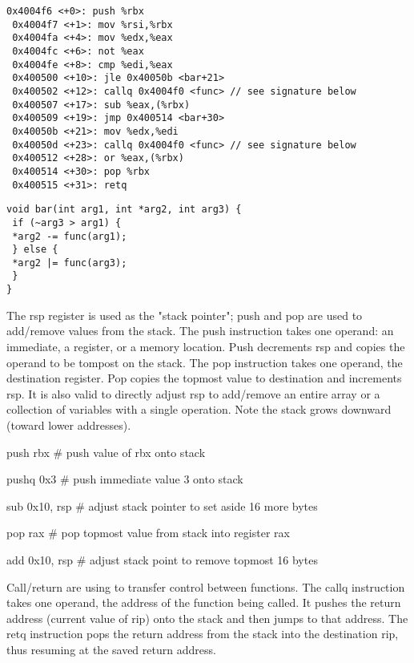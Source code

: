 \documentclass[10pt]{article}
\begin{document}
{\begin{multicols*}{5}
\begin{lstlisting}[breaklines=true,columns=fullflexible]
0x4004f6 <+0>: push %rbx
 0x4004f7 <+1>: mov %rsi,%rbx
 0x4004fa <+4>: mov %edx,%eax
 0x4004fc <+6>: not %eax
 0x4004fe <+8>: cmp %edi,%eax
 0x400500 <+10>: jle 0x40050b <bar+21>
 0x400502 <+12>: callq 0x4004f0 <func> // see signature below
 0x400507 <+17>: sub %eax,(%rbx)
 0x400509 <+19>: jmp 0x400514 <bar+30>
 0x40050b <+21>: mov %edx,%edi
 0x40050d <+23>: callq 0x4004f0 <func> // see signature below
 0x400512 <+28>: or %eax,(%rbx)
 0x400514 <+30>: pop %rbx
 0x400515 <+31>: retq 
\end{lstlisting}

\begin{lstlisting}[breaklines=true,columns=fullflexible]
void bar(int arg1, int *arg2, int arg3) {
 if (~arg3 > arg1) {
 *arg2 -= func(arg1);
 } else {
 *arg2 |= func(arg3);
 }
}
\end{lstlisting}



The rsp register is used as the "stack pointer"; push and pop are used to add/remove values from the stack. The push instruction takes one operand: an immediate, a register, or a memory location. Push decrements rsp and copies the operand to be tompost on the stack. The pop instruction takes one operand, the destination register. Pop copies the topmost value to destination and increments rsp. It is also valid to directly adjust rsp to add/remove an entire array or a collection of variables with a single operation. Note the stack grows downward (toward lower addresses).


push rbx         # push value of rbx onto stack

pushq 0x3        # push immediate value 3 onto stack

sub 0x10, rsp   # adjust stack pointer to set aside 16 more bytes


pop rax          # pop topmost value from stack into register rax

add 0x10, rsp   # adjust stack point to remove topmost 16 bytes

Call/return are using to transfer control between functions. The callq instruction takes one operand, the address of the function being called. It pushes the return address (current value of rip) onto the stack and then jumps to that address. The retq instruction pops the return address from the stack into the destination rip, thus resuming at the saved return address.


\end{multicols*}}
\end{document}
